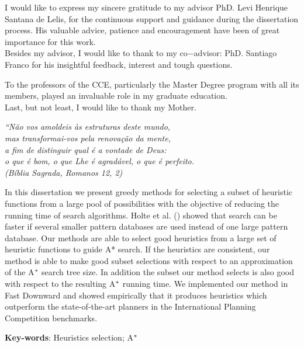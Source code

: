 \documentclass[
	12pt,				%
	openright,		nsubseteq	%
	twoside,			%
	a4paper,			%
	english,			%
	french,				%
	spanish,			%
	brazil				%
	]{abntex2}
\begin{document}
\begin{agradecimentos}
I would like to express my sincere gratitude to my advisor PhD. Levi Henrique Santana de Lelis, for the continuous support and guidance during the dissertation process. His valuable advice, patience and encouragement have been of great
importance for this work. \\

Besides my advisor, I would like to thank to my co$-$advisor: PhD. Santiago Franco for his insightful feedback, interest and tough questions.

To the professors of the CCE, particularly the Master Degree program with all its members, played an invaluable role in my graduate education. \\

Last, but not least, I would like to thank my Mother.
\end{agradecimentos}

\begin{epigrafe}
    \vspace*{\fill}
	\begin{flushright}
		\textit{``Não vos amoldeis às estruturas deste mundo, \\
		mas transformai-vos pela renovação da mente, \\
		a fim de distinguir qual é a vontade de Deus: \\
		o que é bom, o que Lhe é agradável, o que é perfeito.\\
		(Bíblia Sagrada, Romanos 12, 2)}
	\end{flushright}
\end{epigrafe}


\setlength{\absparsep}{18pt} %
\begin{resumo}
In this dissertation we present greedy methods for selecting a subset of heuristic functions from a large pool of possibilities with the objective of reducing the running time of search algorithms. Holte et al. (\citeyear{holte2006maximizing}) showed that search can be faster if several smaller pattern databases are used instead of one large pattern database. Our methods are able to select good heuristics from a large set of heuristic functions to guide A* search. If the heuristics are consistent, our method is able to make good subset selections with respect to an approximation of the A$\sp{*}$ search tree size. In addition the subset our method selects is also good with respect to the resulting A$\sp{*}$ running time. We implemented our method in Fast Downward and showed empirically that it produces heuristics which outperform the state-of-the-art planners in the International Planning Competition benchmarks.

 \textbf{Key-words}: Heuristics selection; A$\sp{*}$
\end{resumo}
\end{document}
